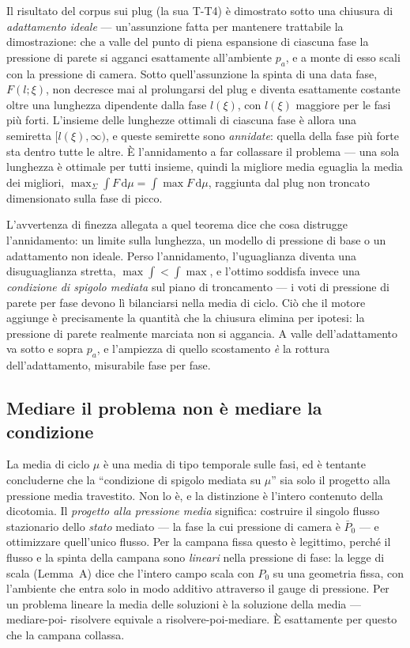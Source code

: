 Il risultato del corpus sui plug (la sua T-T4) è dimostrato sotto
una chiusura di \emph{adattamento ideale} --- un'assunzione fatta per
mantenere trattabile la dimostrazione: che a valle del punto di
piena espansione di ciascuna fase la pressione di parete si agganci
esattamente all'ambiente $p_a$, e a monte di esso scali con la
pressione di camera. Sotto quell'assunzione la spinta di una data
fase, $F(l;\xi)$, non decresce mai al prolungarsi del plug e diventa
esattamente costante oltre una lunghezza dipendente dalla fase
$l(\xi)$, con $l(\xi)$ maggiore per le fasi più forti. L'insieme
delle lunghezze ottimali di ciascuna fase è allora una semiretta
$[l(\xi), \infty)$, e queste semirette sono \emph{annidate}: quella
della fase più forte sta dentro tutte le altre. È l'annidamento a
far collassare il problema --- una sola lunghezza è ottimale per
tutti insieme, quindi la migliore media eguaglia la media dei
migliori,
$\max_\Sigma \int F\,\mathrm{d}\mu = \int \max F\,\mathrm{d}\mu$,
raggiunta dal plug non troncato dimensionato sulla fase di picco.

L'avvertenza di finezza allegata a quel teorema dice che cosa
distrugge l'annidamento: un limite sulla lunghezza, un modello di
pressione di base o un adattamento non ideale. Perso l'annidamento,
l'uguaglianza diventa una disuguaglianza stretta,
$\max\int < \int\max$, e l'ottimo soddisfa invece una
\emph{condizione di spigolo mediata} sul piano di troncamento --- i
voti di pressione di parete per fase devono lì bilanciarsi nella
media di ciclo. Ciò che il motore aggiunge è precisamente la
quantità che la chiusura elimina per ipotesi: la pressione di parete
realmente marciata non si aggancia. A valle dell'adattamento va
sotto e sopra $p_a$, e l'ampiezza di quello scostamento \emph{è} la
rottura dell'adattamento, misurabile fase per fase.

\subsection{Mediare il problema non è mediare la condizione}
\label{sec:avgnotavg}

La media di ciclo $\mu$ è una media di tipo temporale sulle fasi, ed
è tentante concluderne che la ``condizione di spigolo mediata su
$\mu$'' sia solo il progetto alla pressione media travestito. Non lo
è, e la distinzione è l'intero contenuto della dicotomia. Il
\emph{progetto alla pressione media} significa: costruire il singolo
flusso stazionario dello \emph{stato} mediato --- la fase la cui
pressione di camera è $\bar P_0$ --- e ottimizzare quell'unico
flusso. Per la campana fissa questo è legittimo, perché il flusso e
la spinta della campana sono \emph{lineari} nella pressione di fase:
la legge di scala (Lemma~A) dice che l'intero campo scala con $P_0$
su una geometria fissa, con l'ambiente che entra solo in modo
additivo attraverso il gauge di pressione. Per un problema lineare la
media delle soluzioni è la soluzione della media --- mediare-poi-
risolvere equivale a risolvere-poi-mediare. È esattamente per questo
che la campana collassa.

